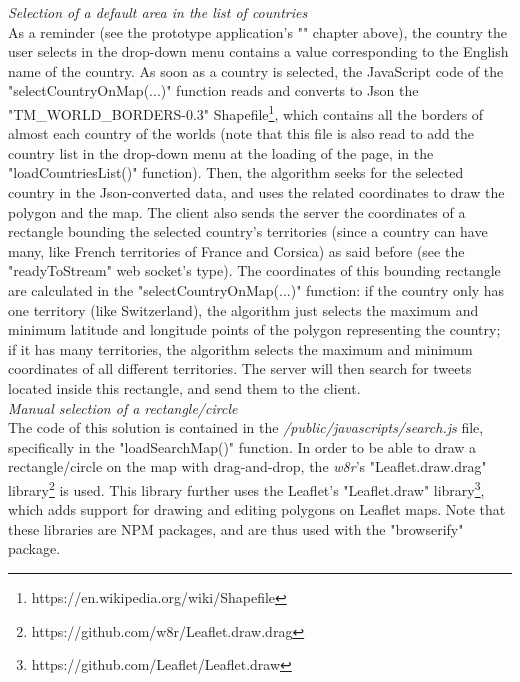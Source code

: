 \documentclass[a4paper,11pt]{report}
\begin{document}
\emph{Selection of a default area in the list of countries}\\
As a reminder (see the prototype application's "" chapter above), the country the user selects in the drop-down menu contains a value corresponding to the English name of the country. As soon as a country is selected, the JavaScript code of the "selectCountryOnMap(...)" function reads and converts to Json the "TM\_WORLD\_BORDERS-0.3" Shapefile\footnote{https://en.wikipedia.org/wiki/Shapefile}, which contains all the borders of almost each country of the worlds (note that this file is also read to add the country list in the drop-down menu at the loading of the page, in the "loadCountriesList()" function). Then, the algorithm seeks for the selected country in the Json-converted data, and uses the related coordinates to draw the polygon and the map. The client also sends the server the coordinates of a rectangle bounding the selected country's territories (since a country can have many, like French territories of France and Corsica) as said before (see the "readyToStream" web socket's type). The coordinates of this bounding rectangle are calculated in the "selectCountryOnMap(...)" function: if the country only has one territory (like Switzerland), the algorithm just selects the maximum and minimum latitude and longitude points of the polygon representing the country; if it has many territories, the algorithm selects the maximum and minimum coordinates of all different territories. The server will then search for tweets located inside this rectangle, and send them to the client.\\

\emph{Manual selection of a rectangle/circle}\\
The code of this solution is contained in the \emph{/public/javascripts/search.js} file, specifically in the "loadSearchMap()" function. In order to be able to draw a rectangle/circle on the map with drag-and-drop, the \emph{w8r}'s "Leaflet.draw.drag" library\footnote{https://github.com/w8r/Leaflet.draw.drag} is used. This library further uses the Leaflet's "Leaflet.draw" library\footnote{https://github.com/Leaflet/Leaflet.draw}, which adds support for drawing and editing polygons on Leaflet maps. Note that these libraries are NPM packages, and are thus used with the "browserify" package.\\
\end{document}
